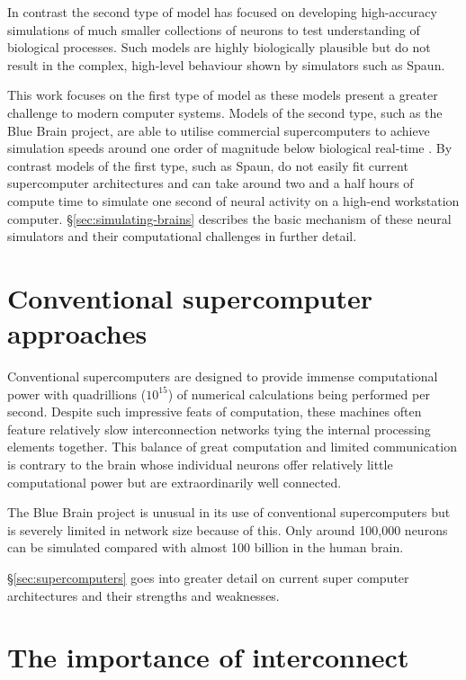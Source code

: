 		In contrast the second type of model has focused on developing
		high-accuracy simulations of much smaller collections of neurons to test
		understanding of biological processes. Such models are highly biologically
		plausible but do not result in the complex, high-level behaviour shown by
		simulators such as Spaun.
		
		This work focuses on the first type of model as these models present a
		greater challenge to modern computer systems. Models of the second type,
		such as the Blue Brain project, are able to utilise commercial
		supercomputers to achieve simulation speeds around one order of magnitude
		below biological real-time \cite{markram06}. By contrast models of the first
		type, such as Spaun, do not easily fit current supercomputer architectures
		and can take around two and a half hours of compute time to simulate one
		second of neural activity on a high-end workstation computer.
		\S\ref{sec:simulating-brains} describes the basic mechanism of these neural
		simulators and their computational challenges in further detail.
	
	\section{Conventional supercomputer approaches}
	
		Conventional supercomputers are designed to provide immense computational
		power with quadrillions ($10^{15}$) of numerical calculations being
		performed per second. Despite such impressive feats of computation, these
		machines often feature relatively slow interconnection networks tying the
		internal processing elements together. This balance of great computation and
		limited communication is contrary to the brain whose individual neurons
		offer relatively little computational power but are extraordinarily well
		connected.
		
		The Blue Brain project is unusual in its use of conventional supercomputers
		but is severely limited in network size because of this.  Only around
		100,000 neurons can be simulated compared with almost 100 billion in the
		human brain.
		
		\S\ref{sec:supercomputers} goes into greater detail on current super
		computer architectures and their strengths and weaknesses.
	
	\section{The importance of interconnect}
		
